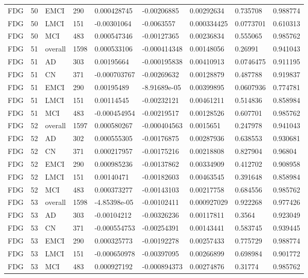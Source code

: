 \begin{landscape}
\begin{longtable}{lllllllll}
FDG & 50 & EMCI & 290 & 0.000428745 & -0.00206885 & 0.00292634 & 0.735708 & 0.988774 \\
FDG & 50 & LMCI & 151 & -0.00301064 & -0.0063557 & 0.000334425 & 0.0773701 & 0.610313 \\
FDG & 50 & MCI & 483 & 0.000547346 & -0.00127365 & 0.00236834 & 0.555065 & 0.985762 \\
FDG & 51 & overall & 1598 & 0.000533106 & -0.000414348 & 0.00148056 & 0.26991 & 0.941043 \\
FDG & 51 & AD & 303 & 0.00195664 & -0.000195838 & 0.00410913 & 0.0746475 & 0.911195 \\
FDG & 51 & CN & 371 & -0.000703767 & -0.00269632 & 0.00128879 & 0.487788 & 0.919837 \\
FDG & 51 & EMCI & 290 & 0.00195489 & -8.91689e-05 & 0.00399895 & 0.0607936 & 0.774781 \\
FDG & 51 & LMCI & 151 & 0.00114545 & -0.00232121 & 0.00461211 & 0.514836 & 0.858984 \\
FDG & 51 & MCI & 483 & -0.000454954 & -0.00219517 & 0.00128526 & 0.607701 & 0.985762 \\
FDG & 52 & overall & 1597 & 0.000580267 & -0.000404563 & 0.0015651 & 0.247978 & 0.941043 \\
FDG & 52 & AD & 302 & 0.000555305 & -0.00176875 & 0.00287936 & 0.638553 & 0.930681 \\
FDG & 52 & CN & 371 & 0.000217957 & -0.00175216 & 0.00218808 & 0.827904 & 0.96804 \\
FDG & 52 & EMCI & 290 & 0.000985236 & -0.00137862 & 0.00334909 & 0.412702 & 0.908958 \\
FDG & 52 & LMCI & 151 & 0.00140471 & -0.00182603 & 0.00463545 & 0.391648 & 0.858984 \\
FDG & 52 & MCI & 483 & 0.000373277 & -0.00143103 & 0.00217758 & 0.684556 & 0.985762 \\
FDG & 53 & overall & 1598 & -4.85398e-05 & -0.00102411 & 0.000927029 & 0.922268 & 0.977426 \\
FDG & 53 & AD & 303 & -0.00104212 & -0.00326236 & 0.00117811 & 0.3564 & 0.923049 \\
FDG & 53 & CN & 371 & -0.000554753 & -0.00254391 & 0.00143441 & 0.583745 & 0.939445 \\
FDG & 53 & EMCI & 290 & 0.000325773 & -0.00192278 & 0.00257433 & 0.775729 & 0.988774 \\
FDG & 53 & LMCI & 151 & -0.000650978 & -0.00397095 & 0.00266899 & 0.698984 & 0.901772 \\
FDG & 53 & MCI & 483 & 0.000927192 & -0.000894373 & 0.00274876 & 0.31774 & 0.985762 \\

\end{longtable}
\end{landscape}
